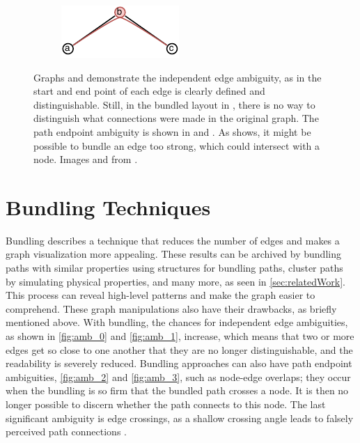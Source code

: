 \begin{figure}[H]
\begin{subfigure}{0.29\linewidth}
        \caption{}
        \label{fig:amb_2}
    \end{subfigure}
    \begin{subfigure}{0.29\linewidth}
        \centering
        \includegraphics[width=\linewidth]{figures/amb/amb_3.pdf}
        \caption{}
        \label{fig:amb_3}
    \end{subfigure}
    \caption{Graphs  and  demonstrate the independent edge ambiguity, as in  the start and end point of each edge is clearly defined and distinguishable. Still, in the bundled layout in , there is no way to distinguish what connections were made in the original graph. The path endpoint ambiguity is shown in  and . As  shows, it might be possible to bundle an edge too strong, which could intersect with a node. Images  and  from \cite{Straub2022}.}
    \label{fig:amb}
\end{figure}

\section{Bundling Techniques}
\label{sec:bundling_techniques}

Bundling describes a technique that reduces the number of edges and makes a graph visualization more appealing. These results can be archived by bundling paths with similar properties using structures for bundling paths, cluster paths by simulating physical properties, and many more, as seen in \autoref{sec:relatedWork}. This process can reveal high-level patterns and make the graph easier to comprehend.
These graph manipulations also have their drawbacks, as briefly mentioned above. With bundling, the chances for independent edge ambiguities, as shown in \autoref{fig:amb_0} and \autoref{fig:amb_1}, increase, which means that two or more edges get so close to one another that they are no longer distinguishable, and the readability is severely reduced. Bundling approaches can also have path endpoint ambiguities, \autoref{fig:amb_2} and \autoref{fig:amb_3}, such as node-edge overlaps; they occur when the bundling is so firm that the bundled path crosses a node. It is then no longer possible to discern whether the path connects to this node. The last significant ambiguity is edge crossings, as a shallow crossing angle leads to falsely perceived path connections \cite{wallinger_edge-path_2022}.

